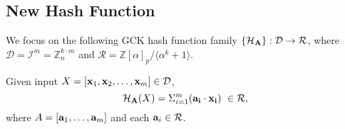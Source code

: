 \subsection{New Hash Function}\label{new_hash}
We focus on the following GCK hash function family $\{{\cal H}_{\bf A}\}: \mathcal{D} \rightarrow \mathcal{R}$, where $\mathcal{D} = \mathcal{I}^{m} = \mathbb{Z}_{n}^{k\cdot m}$ and $\mathcal{R}= \mathbb{Z}[\alpha]_{p}/\langle \alpha^{k}+1 \rangle$. 

Given input $X=[{\bf x}_{1}, {\bf x}_{2}, \ldots, {\bf x}_{m}] \in \mathcal{D}$, 
\begin{equation}\label{product}
 {\cal H}_{\bf A}(X) = \Sigma_{i=1}^{m} ({\bf a_{i} \cdot x_{i}})   \,\, \in \mathcal{R},
\end{equation}
where $A=[{\bf a}_{1},\ldots,{\bf a}_{m} ]$ and each ${\bf a}_{i}\in \mathcal{R}$.

